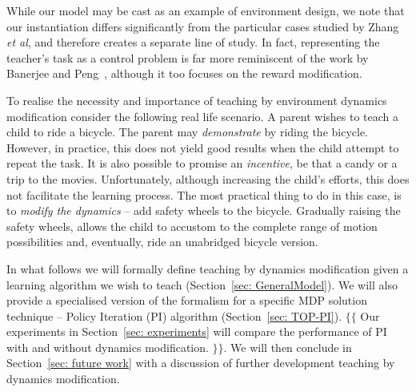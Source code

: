 While our model may be cast as an example of environment design, we
note that our instantiation differs significantly from the particular
cases studied by Zhang \emph{et al}, and therefore creates a separate
line of study. In fact, representing the teacher's task as a control
problem is far more reminiscent of the work by Banerjee and
Peng~\cite{banerjee_peng_2005}, although it too focuses on the reward
modification.

To realise the necessity and importance of teaching by
environment dynamics modification consider the following real life
scenario. A parent wishes to teach a child to ride a bicycle. The
parent may {\em demonstrate} by riding the bicycle. However, in
practice, this does not yield good results when the child attempt to
repeat the task. It is also possible to promise an {\em incentive}, be
that a candy or a trip to the movies. Unfortunately, although
increasing the child's efforts, this does not facilitate the learning
process. The most practical thing to do in this case, is to {\em
  modify the dynamics} -- add safety wheels to the bicycle. Gradually
raising the safety wheels, allows the child to accustom to the
complete range of motion possibilities and, eventually, ride an
unabridged bicycle version.

In what follows we will formally define teaching by dynamics
modification given a learning algorithm we wish to teach
(Section~\ref{sec: GeneralModel}). We will also provide a specialised
version of the formalism for a specific MDP solution technique --
Policy Iteration (PI) algorithm (Section~\ref{sec: TOP-PI}). $\{\{$
Our experiments in Section~\ref{sec: experiments} will compare the
performance of PI with and without dynamics modification. $\}\}$. We
will then conclude in Section~\ref{sec: future work} with a discussion
of further development teaching by dynamics modification.

